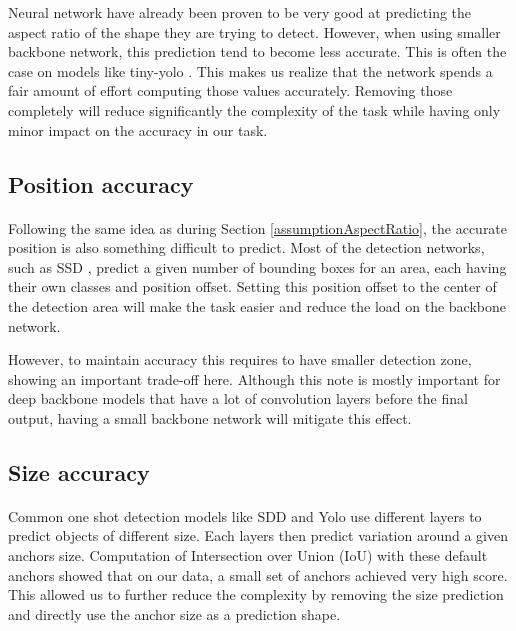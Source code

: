 Neural network have already been proven to be very good at predicting the aspect ratio of the shape they are trying to detect. However, when using smaller backbone network, this prediction tend to become less accurate. This is often the case on models like tiny-yolo \cite{yolov3}. This makes us realize that the network spends a fair amount of effort computing those values accurately. Removing those completely will reduce significantly the complexity of the task while having only minor impact on the accuracy in our task.

\subsection{Position accuracy}
\paragraph{}
Following the same idea as during Section \ref{assumptionAspectRatio}, the accurate position is also something difficult to predict. Most of the detection networks, such as SSD \cite{liu2016ssd}, predict a given number of bounding boxes for an area, each having their own classes and position offset. Setting this position offset to the center of the detection area will make the task easier and reduce the load on the backbone network.

However, to maintain accuracy this requires to have smaller detection zone, showing an important trade-off here. Although this note is mostly important for deep backbone models that have a lot of convolution layers before the final output, having a small backbone network will mitigate this effect.

\subsection{Size accuracy}
\paragraph{}
Common one shot detection models like SDD \cite{liu2016ssd} and Yolo \cite{yolov3} use different layers to predict objects of different size. Each layers then predict variation around a given anchors size. Computation of Intersection over Union (IoU) with these default anchors showed that on our data, a small set of anchors achieved very high score. This allowed us to further reduce the complexity by removing the size prediction and directly use the anchor size as a prediction shape.

